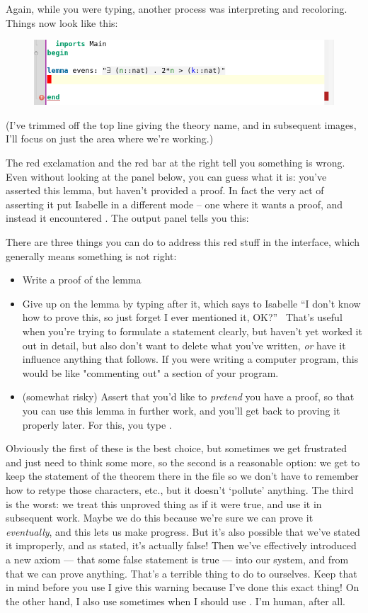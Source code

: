 Again, while you were typing, another process was interpreting and recoloring. Things now look like this:
\begin{figure}[h]
    \includegraphics[width=0.75\linewidth]{TEXT/C01/Images/unproved-lemma.png}
\end{figure}
\newpage
(I've trimmed off the top line giving the theory name, and in subsequent images, I'll focus on just the area where we're working.)

The red exclamation and the red bar at the right tell you something is wrong. Even without looking at the  panel below, you can guess what it is: you've asserted this lemma, but haven't provided a proof. In fact the very act of asserting it put Isabelle in a different mode -- one where it wants a proof, and instead it encountered . The output panel tells you this:

There are three things you can do to address this red stuff in the interface, which generally means something is not right:

\begin{itemize}
    \item Write a proof of the lemma
    \item Give up on the lemma by typing  after it, which says to Isabelle ``I don't know how to prove this, so just forget I ever mentioned it, OK?''  That's useful when you're trying to formulate a statement clearly, but haven't yet worked it out in detail, but also don't want to delete what you've written, \textit{or} have it influence anything that follows. If you were writing a computer program, this would be like "commenting out" a section of your program. 
    \item  (somewhat risky) Assert that you'd like to \textit{pretend} you have a proof, so that you can use this lemma in further work, and you'll get back to proving it properly later. For this, you type .
\end{itemize}

Obviously the first of these is the best choice, but sometimes we get frustrated and just need to think some more, so the second is a reasonable option: we get to keep the statement of the theorem there in the file so we don't have to remember how to retype those characters, etc., but it doesn't `pollute' anything. The third is the worst: we treat this unproved thing as if it were true, and use it in subsequent work. Maybe we do this because we're sure we can prove it \textit{eventually}, and this lets us make progress. But it's also possible that we've stated it improperly, and as stated, it's actually false! Then we've effectively introduced a new axiom --- that some false statement is true --- into our system, and from that we can prove anything. That's a terrible thing to do to ourselves. Keep that in mind before you use  I give this warning because I've done this exact thing! On the other hand, I also use  sometimes when I should use . I'm human, after all. 

